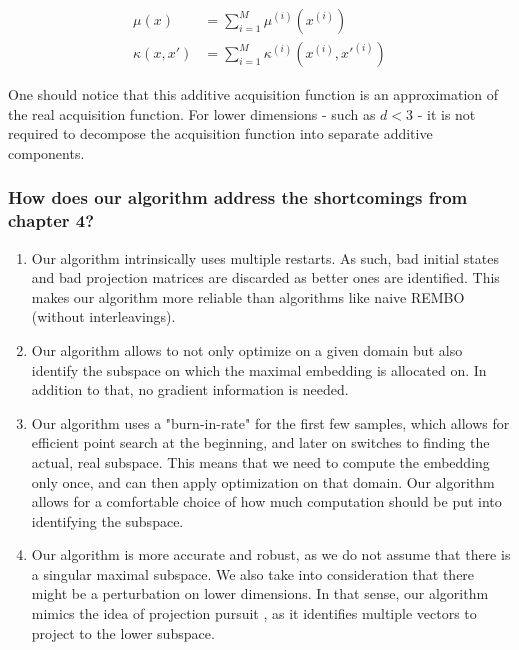 
\begin{align}
\mu(x) &= \sum_{i=1}^{M} \mu^{(i)} ( x^{(i)} ) \\
\kappa(x, x') &= \sum_{i=1}^{M} \kappa^{(i)} ( x^{(i)}, x'^{(i)}  )
\end{align}

One should notice that this additive acquisition function is an approximation of the real acquisition function. 
For lower dimensions - such as $d<3$ - it is not required to decompose the acquisition function into separate additive components.

\subsubsection{How does our algorithm address the shortcomings from chapter 4?}

\begin{enumerate}
\item Our algorithm intrinsically uses multiple restarts.
As such, bad initial states and bad projection matrices are discarded as better ones are identified.
This makes our algorithm more reliable than algorithms like naive REMBO (without interleavings).
\item Our algorithm allows to not only optimize on a given domain but also identify the subspace on which the maximal embedding is allocated on.
In addition to that, no gradient information is needed.
\item Our algorithm uses a "burn-in-rate" for the first few samples, which allows for efficient point search at the beginning, and later on switches to finding the actual, real subspace.
This means that we need to compute the embedding only once, and can then apply optimization on that domain.
Our algorithm allows for a comfortable choice of how much computation should be put into identifying the subspace.
\item Our algorithm is more accurate and robust, as we do not assume that there is a singular maximal subspace. 
We also take into consideration that there might be a perturbation on lower dimensions.
In that sense, our algorithm mimics the idea of projection pursuit \citep{ProjectionPursuit}, as it identifies multiple vectors to project to the lower subspace.
\end{enumerate}


